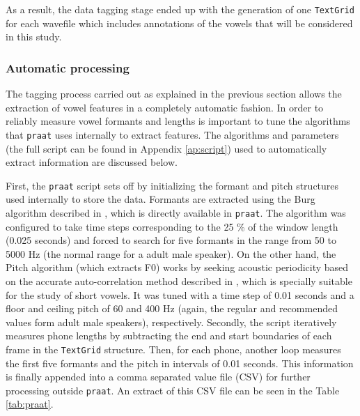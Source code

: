 \documentclass[a4paper,11pt]{article}
\begin{document}
As a result, the data tagging stage ended up with the generation of one \texttt{TextGrid} for each wavefile which includes annotations of the vowels that will be considered in this study.

\subsubsection{Automatic processing}

The tagging process carried out as explained in the previous section allows the extraction of vowel features in a  completely automatic fashion. In order to  reliably measure vowel formants and lengths is important to tune the algorithms that \texttt{praat} uses internally to extract features. The algorithms and parameters (the full script can be found in Appendix \ref{ap:script}) used to automatically extract information are discussed below.

First, the \texttt{praat} script sets off by initializing the formant and pitch structures used internally to store the data. Formants are extracted using the Burg algorithm described in \cite{childers1978modern}, which is directly available in \texttt{praat}. The algorithm was configured to take time steps corresponding to the 25 \% of the window length (0.025 seconds) and forced to search for five formants in the range from 50 to 5000 Hz (the normal range for a adult male speaker). On the other hand, the Pitch algorithm (which extracts F0) works by seeking acoustic periodicity based on the accurate auto-correlation method described in  \cite{boersma1993accurate}, which is specially suitable for the study of short vowels. It was tuned with a time step of 0.01 seconds and a floor and ceiling pitch of 60 and 400 Hz (again, the regular and recommended values form adult male speakers), respectively. Secondly, the script iteratively measures phone lengths by subtracting the end and start boundaries of each frame in the \texttt{TextGrid} structure. Then, for each phone, another loop measures the first five formants and the pitch in intervals of 0.01 seconds. This information is finally appended into a comma separated value file (CSV) for further processing outside \texttt{praat}. An extract of this CSV file can be seen in the Table \ref{tab:praat}.
\end{document}
